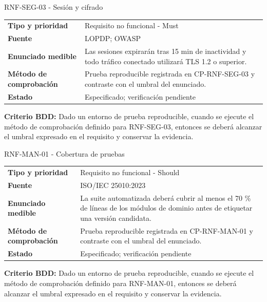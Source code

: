 \begin{reqbox}[colframe=Teal]{RNF-SEG-03 - Sesión y cifrado}
\begin{tabularx}{\textwidth}{>{\bfseries}p{3.2cm}Y}
Tipo y prioridad & Requisito no funcional - Must \\
Fuente & LOPDP; OWASP \\
Enunciado medible & Las sesiones expirarán tras 15 min de inactividad y todo tráfico conectado utilizará TLS 1.2 o superior. \\
Método de comprobación & Prueba reproducible registrada en CP-RNF-SEG-03 y contraste con el umbral del enunciado. \\
Estado & Especificado; verificación pendiente \\
\end{tabularx}
\textbf{Criterio BDD:} Dado un entorno de prueba reproducible, cuando se ejecute el método de comprobación definido para RNF-SEG-03, entonces se deberá alcanzar el umbral expresado en el requisito y conservar la evidencia.
\end{reqbox}


\begin{reqbox}[colframe=Teal]{RNF-MAN-01 - Cobertura de pruebas}
\begin{tabularx}{\textwidth}{>{\bfseries}p{3.2cm}Y}
Tipo y prioridad & Requisito no funcional - Should \\
Fuente & ISO/IEC 25010:2023 \\
Enunciado medible & La suite automatizada deberá cubrir al menos el 70 \% de líneas de los módulos de dominio antes de etiquetar una versión candidata. \\
Método de comprobación & Prueba reproducible registrada en CP-RNF-MAN-01 y contraste con el umbral del enunciado. \\
Estado & Especificado; verificación pendiente \\
\end{tabularx}
\textbf{Criterio BDD:} Dado un entorno de prueba reproducible, cuando se ejecute el método de comprobación definido para RNF-MAN-01, entonces se deberá alcanzar el umbral expresado en el requisito y conservar la evidencia.
\end{reqbox}


